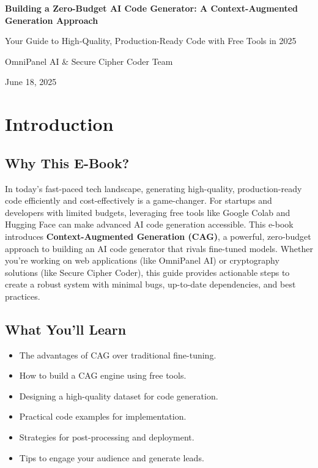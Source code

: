 \documentclass[12pt]{article}
\begin{document}
\begin{titlepage}
  \vspace*{\fill}
  \centering
  {\Huge\bfseries Building a Zero-Budget AI Code Generator: A Context-Augmented Generation Approach\par}
  \vspace{1cm}
  {\Large Your Guide to High-Quality, Production-Ready Code with Free Tools in 2025\par}
  \vspace{2cm}
  {\large OmniPanel AI \& Secure Cipher Coder Team\par}
  \vspace{0.5cm}
  {\large June 18, 2025\par}
  \vspace*{\fill}
\end{titlepage}

\tableofcontents
\newpage

\section{Introduction}
\subsection{Why This E-Book?}
In today's fast-paced tech landscape, generating high-quality, production-ready code efficiently and cost-effectively is a game-changer. For startups and developers with limited budgets, leveraging free tools like Google Colab and Hugging Face can make advanced AI code generation accessible. This e-book introduces \textbf{Context-Augmented Generation (CAG)}, a powerful, zero-budget approach to building an AI code generator that rivals fine-tuned models. Whether you're working on web applications (like OmniPanel AI) or cryptography solutions (like Secure Cipher Coder), this guide provides actionable steps to create a robust system with minimal bugs, up-to-date dependencies, and best practices.

\subsection{What You'll Learn}
\begin{itemize}
  \item The advantages of CAG over traditional fine-tuning.
  \item How to build a CAG engine using free tools.
  \item Designing a high-quality dataset for code generation.
  \item Practical code examples for implementation.
  \item Strategies for post-processing and deployment.
  \item Tips to engage your audience and generate leads.
\end{itemize}
\end{document}
